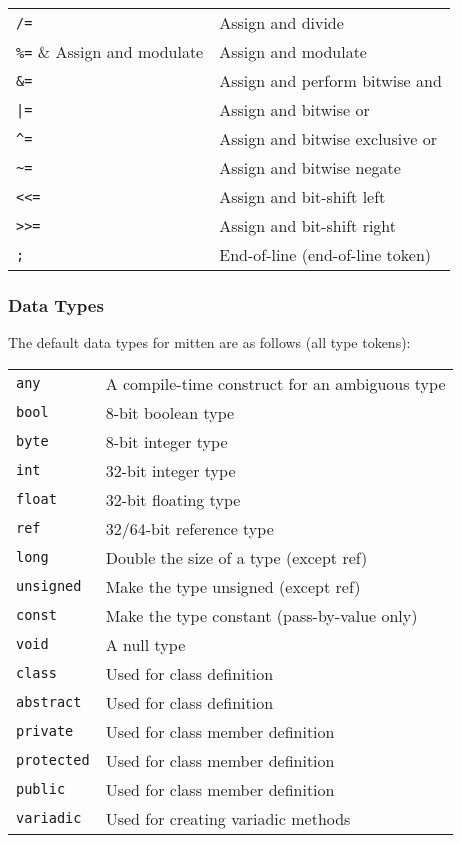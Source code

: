 \documentclass[10pt,a4paper]{article}
\begin{document}
\begin{tabular}{l l}
\verb|/=| & Assign and divide \\
\verb|%=| & Assign and modulate \\
\verb|&=| & Assign and perform bitwise and \\
\verb/|=/ & Assign and bitwise or \\
\verb|^=| & Assign and bitwise exclusive or \\
\verb|~=| & Assign and bitwise negate \\
\verb|<<=| & Assign and bit-shift left \\
\verb|>>=| & Assign and bit-shift right \\
\verb|;| & End-of-line (end-of-line token) \\
\end{tabular}

\subsubsection{Data Types}
\label{sec:dataTypes}
The default data types for mitten are as follows (all type tokens):

\begin{tabular}{l l}
\verb|any| & A compile-time construct for an ambiguous type \\
\verb|bool| & 8-bit boolean type \\
\verb|byte| & 8-bit integer type \\
\verb|int| & 32-bit integer type \\
\verb|float| & 32-bit floating type \\
\verb|ref| & 32/64-bit reference type \\
\verb|long| & Double the size of a type (except ref) \\
\verb|unsigned| & Make the type unsigned (except ref) \\
\verb|const| & Make the type constant (pass-by-value only) \\
\verb|void| & A null type \\
\verb|class| & Used for class definition \\
\verb|abstract| & Used for class definition \\
\verb|private| & Used for class member definition \\
\verb|protected| & Used for class member definition \\
\verb|public| & Used for class member definition \\
\verb|variadic| & Used for creating variadic methods \\
\end{tabular}
\end{document}
